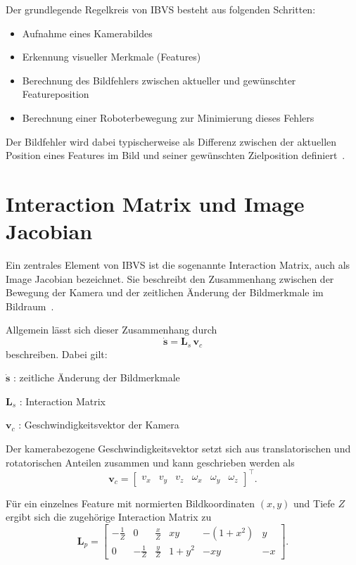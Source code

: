 Der grundlegende Regelkreis von \ac{IBVS} besteht aus folgenden Schritten:
\begin{itemize}
	\item Aufnahme eines Kamerabildes
	\item Erkennung visueller Merkmale (Features)
	\item Berechnung des Bildfehlers zwischen aktueller und gewünschter Featureposition
	\item Berechnung einer Roboterbewegung zur Minimierung dieses Fehlers
\end{itemize}
Der Bildfehler wird dabei typischerweise als Differenz zwischen der aktuellen Position eines Features im Bild und seiner gewünschten Zielposition definiert~\cite{chaumette2006visual}.

\section{Interaction Matrix und Image Jacobian}
\label{sec:InteractionMatrixundImageJacobian}

Ein zentrales Element von \ac{IBVS} ist die sogenannte Interaction Matrix, auch als Image Jacobian bezeichnet. Sie beschreibt den Zusammenhang zwischen der Bewegung der Kamera und der zeitlichen Änderung der Bildmerkmale im Bildraum~\cite{chaumette2006visual, corke2017robotics}.

Allgemein lässt sich dieser Zusammenhang durch
\begin{equation}
\dot{\mathbf{s}} = \mathbf{L}_s \, \mathbf{v}_c
\end{equation}
beschreiben. Dabei gilt:
\begin{listNorm}
    \item $\dot{\mathbf{s}}$ : zeitliche Änderung der Bildmerkmale
    \item $\mathbf{L}_s$ : Interaction Matrix
    \item $\mathbf{v}_c$ : Geschwindigkeitsvektor der Kamera
\end{listNorm}

Der kamerabezogene Geschwindigkeitsvektor setzt sich aus translatorischen und rotatorischen Anteilen zusammen und kann geschrieben werden als
\begin{equation}
\mathbf{v}_c =
\begin{bmatrix}
v_x & v_y & v_z & \omega_x & \omega_y & \omega_z
\end{bmatrix}^{\top}.
\end{equation}

Für ein einzelnes Feature mit normierten Bildkoordinaten $(x,y)$ und Tiefe $Z$ ergibt sich die zugehörige Interaction Matrix zu~\cite{chaumette2006visual}
\begin{equation}
\mathbf{L}_p =
\begin{bmatrix}
-\frac{1}{Z} & 0 & \frac{x}{Z} & xy & -(1+x^2) & y \\
0 & -\frac{1}{Z} & \frac{y}{Z} & 1+y^2 & -xy & -x
\end{bmatrix}.
\end{equation}

